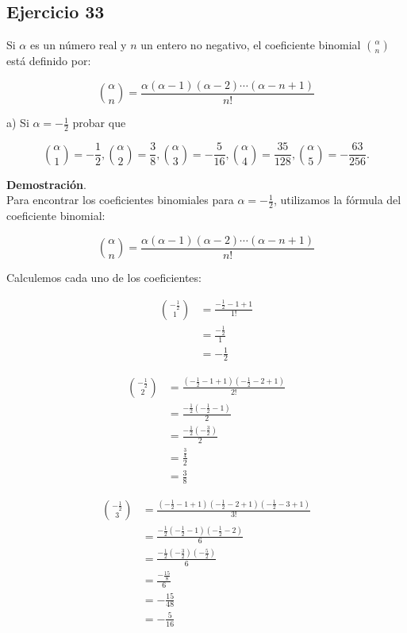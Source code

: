 \documentclass{article}
\begin{document}
    \subsection*{Ejercicio 33}

    Si $\alpha$ es un número real y $n$ un entero no negativo, el coeficiente binomial $\binom{\alpha}{n}$ está definido por:

    $$
    \binom{\alpha}{n}=\frac{\alpha(\alpha-1)(\alpha-2) \cdots(\alpha-n+1)}{n!}
    $$

    a) Si $\alpha=-\frac{1}{2}$ probar que

    $$
    \binom{\alpha}{1}=-\frac{1}{2},\binom{\alpha}{2}=\frac{3}{8},\binom{\alpha}{3}=-\frac{5}{16},\binom{\alpha}{4}=\frac{35}{128},\binom{\alpha}{5}=-\frac{63}{256} .
    $$

    \textbf{Demostración}.\\

    Para encontrar los coeficientes binomiales para $\alpha = -\frac{1}{2}$, utilizamos la fórmula del coeficiente binomial:

    $$
    \binom{\alpha}{n}=\frac{\alpha(\alpha-1)(\alpha-2) \cdots(\alpha-n+1)}{n!}
    $$

    Calculemos cada uno de los coeficientes:

    \begin{align*}
    \binom{-\frac{1}{2}}{1} & =\frac{-\frac{1}{2}-1+1}{1!} \\
    & =\frac{-\frac{1}{2}}{1} \\
    & =-\frac{1}{2}
    \end{align*}

    \begin{align*}
    \binom{-\frac{1}{2}}{2} & =\frac{\left(-\frac{1}{2}-1+1\right)\left(-\frac{1}{2}-2+1\right)}{2!} \\
    & =\frac{-\frac{1}{2}\left(-\frac{1}{2}-1\right)}{2} \\
    & =\frac{-\frac{1}{2}\left(-\frac{3}{2}\right)}{2} \\
    & =\frac{\frac{3}{4}}{2} \\
    & =\frac{3}{8}
    \end{align*}

    \begin{align*}
    \binom{-\frac{1}{2}}{3} & =\frac{\left(-\frac{1}{2}-1+1\right)\left(-\frac{1}{2}-2+1\right)\left(-\frac{1}{2}-3+1\right)}{3!} \\
    & =\frac{-\frac{1}{2}\left(-\frac{1}{2}-1\right)\left(-\frac{1}{2}-2\right)}{6} \\
    & =\frac{-\frac{1}{2}\left(-\frac{3}{2}\right)\left(-\frac{5}{2}\right)}{6} \\
    & =\frac{-\frac{15}{8}}{6} \\
    & =-\frac{15}{48} \\
    & =-\frac{5}{16}
    \end{align*}
\end{document}
